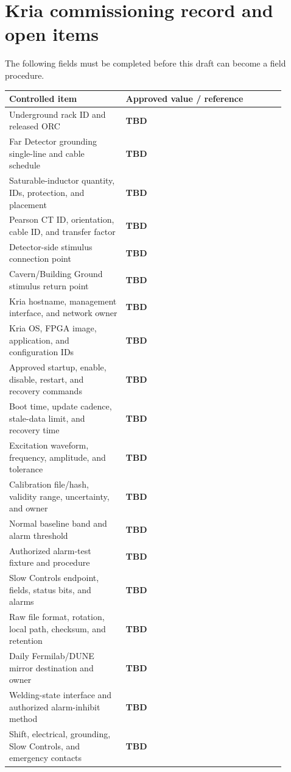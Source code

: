 \documentclass[11pt]{article}
\newcommand{\TBD}{\textcolor{dunered}{\textbf{TBD}}}
\begin{document}
\section{Kria commissioning record and open items}

The following fields must be completed before this draft can become a field procedure.

\begin{longtable}{@{}L{0.38\linewidth}L{0.52\linewidth}@{}}
\toprule
Controlled item & Approved value / reference \\
\midrule
\endhead
Underground rack ID and released ORC & \TBD \\
Far Detector grounding single-line and cable schedule & \TBD \\
Saturable-inductor quantity, IDs, protection, and placement & \TBD \\
Pearson CT ID, orientation, cable ID, and transfer factor & \TBD \\
Detector-side stimulus connection point & \TBD \\
Cavern/Building Ground stimulus return point & \TBD \\
Kria hostname, management interface, and network owner & \TBD \\
Kria OS, FPGA image, application, and configuration IDs & \TBD \\
Approved startup, enable, disable, restart, and recovery commands & \TBD \\
Boot time, update cadence, stale-data limit, and recovery time & \TBD \\
Excitation waveform, frequency, amplitude, and tolerance & \TBD \\
Calibration file/hash, validity range, uncertainty, and owner & \TBD \\
Normal baseline band and alarm threshold & \TBD \\
Authorized alarm-test fixture and procedure & \TBD \\
Slow Controls endpoint, fields, status bits, and alarms & \TBD \\
Raw file format, rotation, local path, checksum, and retention & \TBD \\
Daily Fermilab/DUNE mirror destination and owner & \TBD \\
Welding-state interface and authorized alarm-inhibit method & \TBD \\
Shift, electrical, grounding, Slow Controls, and emergency contacts & \TBD \\
\bottomrule
\end{longtable}
\end{document}
